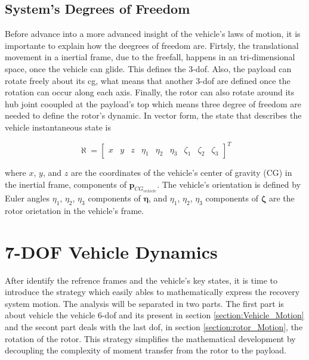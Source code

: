 \subsection{System's Degrees of Freedom}

Before advance into a more advanced insight of the vehicle's laws of motion, it is importante to explain how the deegrees of freedom are. Firtsly, the translational movement in a inertial frame, due to the freefall, happens in an tri-dimensional space, once the vehicle can glide. This defines the 3-\gls{dof}. Also, the payload can rotate freely about its \gls{cg}, what means that another 3-\gls{dof} are defined once the rotation can occur along each axis. Finally, the rotor can also rotate around its hub joint cooupled at the payload's top which means three degree of freedom are needed to define the rotor's dynamic. In vector form, the state that describes the vehicle instantaneous state is 

\begin{equation}
    \aleph = \begin{bmatrix}
        x & y & z & \eta_1 & \eta_2 & \eta_3 & \zeta_1 & \zeta_2 & \zeta_3
    \end{bmatrix}^T
\end{equation}

where $x$, $y$, and $z$ are the coordinates of the vehicle's center of gravity (CG) in the inertial frame, components of $\mathbf{p}_{CG_{vehicle}}$. The vehicle's orientation is defined by Euler angles $\eta_1$, $\eta_2$, $\eta_3$ components of $\boldsymbol{\eta}$, and $\eta_1$, $\eta_2$, $\eta_3$ components of $\boldsymbol{\zeta}$ are the rotor orietation in the vehicle's frame.


\section{7-DOF Vehicle Dynamics}
\label{section:vehicle_dynamics}

After identify the refrence frames and the vehicle's key states, it is time to introduce the strategy which easily ables to mathematically express the recovery system motion. The analysis will be separated in two parts. The first part is about vehicle the vehicle 6-\gls{dof} and its present in section \ref{section:Vehicle_Motion} and the secont part deals with the last \gls{dof}, in section \ref{section:rotor_Motion}, the rotation of the rotor. This strategy simplifies the mathematical development by decoupling the complexity of moment transfer from the rotor to the payload.


